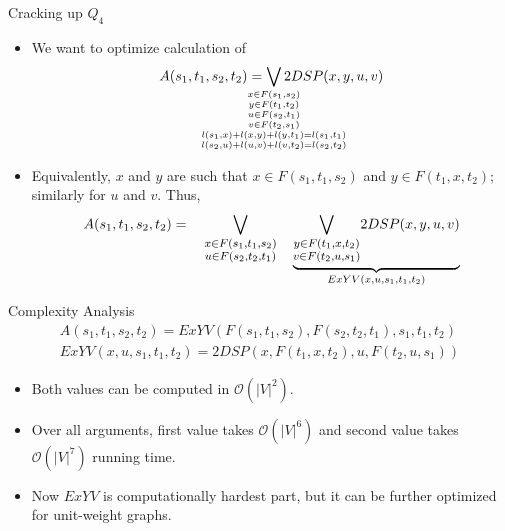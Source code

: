 \documentclass{beamer}
\newcommand{\OO}{\mathcal{O}}
\begin{document}
\begin{frame}{Cracking up $Q_4$}
    \begin{itemize}
        \item We want to optimize calculation of
        \begin{equation}
        \small
        A(s_1, t_1, s_2, t_2) = \smashoperator{\bigvee_{
        \small \substack{
            x \in F(s_1, s_2)\\ 
            y \in F(t_1, t_2)\\ 
            u \in F(s_2, t_1)\\ 
            v \in F(t_2, s_1)\\ 
            l(s_1, x) + l(x, y) + l(y, t_1) = l(s_1, t_1)\\ 
            l(s_2, u) + l(u, v) + l(v, t_2) = l(s_2, t_2)
        }
        }} 2DSP(x, y, u, v)
        \end{equation}
        \item Equivalently, $x$ and $y$ are such that $x \in F(s_1, t_1, s_2)$ and $y \in F(t_1, x, t_2)$; similarly for $u$ and $v$. Thus,
        \begin{equation} 
            A(s_1, t_1, s_2, t_2) = \quad
            {\bigvee_{
            \large \substack{
                x \in F(s_1, t_1, s_2)\\ 
                u \in F(s_2, t_2, t_1) 
            }
            }}
            \quad \underbrace{
            {\bigvee_{
            \large \substack{
                y \in F(t_1, x, t_2)\\ 
                v \in F(t_2, u, s_1) 
            }
            }} 2DSP(x, y, u, v)}_{ExYV(x, u, s_1, t_1, t_2)}
        \end{equation}
    \end{itemize}
\end{frame}

\begin{frame}{Complexity Analysis}
    \begin{align} \label{eq:ExYV}
        A(s_1, t_1, s_2, t_2) = ExYV(F(s_1, t_1, s_2), F(s_2, t_2, t_1), s_1, t_1, t_2)\\
        ExYV(x, u, s_1, t_1, t_2) = 2DSP(x, F(t_1, x, t_2), u, F(t_2, u, s_1))
    \end{align}
    \begin{itemize}
        \item Both values can be computed in $\OO(|V|^2)$.
        \item Over all arguments, first value takes $\OO(|V|^6)$ and second value takes $\OO(|V|^7)$ running time.
        \item Now $ExYV$ is computationally hardest part, but it can be further optimized for unit-weight graphs.
    \end{itemize}
\end{frame}
\end{document}

